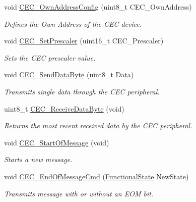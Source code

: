 \begin{DoxyCompactItemize}
void \mbox{\hyperlink{group___c_e_c___exported___functions_gacad422ef1f50246b2021b41835b8a95c}{C\+E\+C\+\_\+\+Own\+Address\+Config}} (uint8\+\_\+t C\+E\+C\+\_\+\+Own\+Address)
\begin{DoxyCompactList}\small\item\em Defines the Own Address of the C\+EC device. \end{DoxyCompactList}\item 
void \mbox{\hyperlink{group___c_e_c___exported___functions_gad2fc626e28a82008a29f062975a9af11}{C\+E\+C\+\_\+\+Set\+Prescaler}} (uint16\+\_\+t C\+E\+C\+\_\+\+Prescaler)
\begin{DoxyCompactList}\small\item\em Sets the C\+EC prescaler value. \end{DoxyCompactList}\item 
void \mbox{\hyperlink{group___c_e_c___exported___functions_ga6897ab26d8f909f9160e9fac54b97441}{C\+E\+C\+\_\+\+Send\+Data\+Byte}} (uint8\+\_\+t Data)
\begin{DoxyCompactList}\small\item\em Transmits single data through the C\+EC peripheral. \end{DoxyCompactList}\item 
uint8\+\_\+t \mbox{\hyperlink{group___c_e_c___exported___functions_ga165837bff6292e7674eff6f8b230da97}{C\+E\+C\+\_\+\+Receive\+Data\+Byte}} (void)
\begin{DoxyCompactList}\small\item\em Returns the most recent received data by the C\+EC peripheral. \end{DoxyCompactList}\item 
void \mbox{\hyperlink{group___c_e_c___exported___functions_ga71e700461ffe7820d9e1c75da65fd0fb}{C\+E\+C\+\_\+\+Start\+Of\+Message}} (void)
\begin{DoxyCompactList}\small\item\em Starts a new message. \end{DoxyCompactList}\item 
void \mbox{\hyperlink{group___c_e_c___exported___functions_ga1e2cf6e3a1ac891f2814f9d3f4043574}{C\+E\+C\+\_\+\+End\+Of\+Message\+Cmd}} (\mbox{\hyperlink{group___exported__types_gac9a7e9a35d2513ec15c3b537aaa4fba1}{Functional\+State}} New\+State)
\begin{DoxyCompactList}\small\item\em Transmits message with or without an E\+OM bit. \end{DoxyCompactList}\item 

\end{DoxyCompactItemize}
